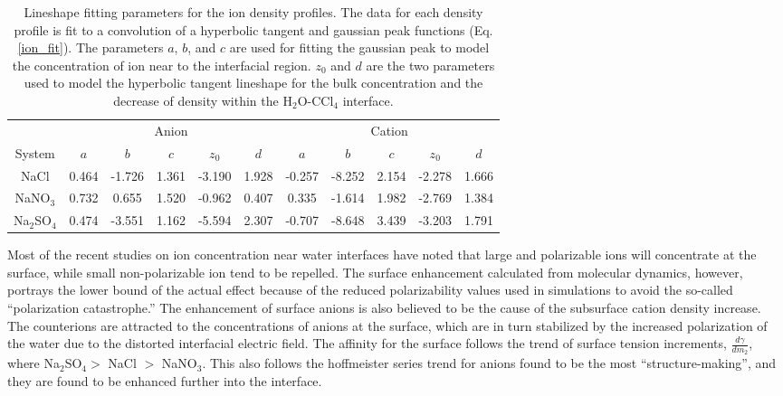 \begin{table}[htdp]
	\begin{center}
	\begin{tabular}{c|c|c|c|c|c|c|c|c|c|c|}
		\cline{2-11}
		\multicolumn{1}{c|}{} & \multicolumn{5}{c}{Anion} & \multicolumn{5}{|c|}{Cation} \\ 
		\cline{1-11}
		\multicolumn{1}{|c|}{System} & $a$ & $b$ & $c$ & $z_0$ & $d$ & $a$ & $b$ & $c$ & $z_0$ & $d$ \\ \hline
		\multicolumn{1}{|c|}{NaCl} & 0.464 & -1.726 & 1.361 & -3.190 & 1.928 & -0.257 & -8.252 & 2.154 & -2.278 & 1.666 \\ \hline
		\multicolumn{1}{|c|}{NaNO$_3$} & 0.732 & 0.655 & 1.520 & -0.962 & 0.407 & 0.335 & -1.614 & 1.982 & -2.769 & 1.384 \\ \hline
		\multicolumn{1}{|c|}{Na$_2$SO$_4$} & 0.474 & -3.551 & 1.162 & -5.594 & 2.307 & -0.707 & -8.648 & 3.439 & -3.203 & 1.791 \\ \hline
	\end{tabular}
	\end{center}
	\caption{Lineshape fitting parameters for the ion density profiles. The data for each density profile is fit to a convolution of a hyperbolic tangent and gaussian peak functions (Eq. \ref{ion_fit}). The parameters $a$, $b$, and $c$ are used for fitting the gaussian peak to model the concentration of ion near to the interfacial region. $z_0$ and $d$ are the two parameters used to model the hyperbolic tangent lineshape for the bulk concentration and the decrease of density within the H$_2$O-CCl$_4$ interface.}
	\label{ion_params}
\end{table}

Most of the recent studies on ion concentration near water interfaces have noted that large and polarizable ions will concentrate at the surface,\cite{Petersen2005b,Pegram2006,Sloutskin2007,Eggimann2008} while small non-polarizable ion tend to be repelled. The surface enhancement calculated from molecular dynamics, however, portrays the lower bound of the actual effect because of the reduced polarizability values used in simulations to avoid the so-called ``polarization catastrophe.'' The enhancement of surface anions is also believed to be the cause of the subsurface cation density increase. The counterions are attracted to the concentrations of anions at the surface, which are in turn stabilized by the increased polarization of the water due to the distorted interfacial electric field. The affinity for the surface follows the trend of surface tension increments, $\frac{d\gamma}{dm_2}$, where Na$_2$SO$_4 >$ NaCl $>$ NaNO$_3$.\cite{Pegram2006} This also follows the hoffmeister series trend for anions found to be the most ``structure-making'', and they are found to be enhanced further into the interface.
